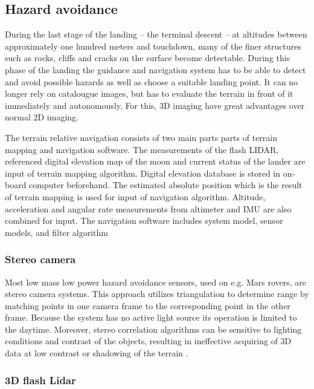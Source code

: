 \subsection{Hazard avoidance}

During the last stage of the landing – the terminal descent – at altitudes between approximately one hundred meters and touchdown, many of the finer structures such as rocks, cliffs and cracks on the surface become detectable. During this phase of the landing the guidance and navigation system has to be able to detect and avoid possible hazards as well as choose a suitable landing point. It can no longer rely on catalougue images, but has to evaluate the terrain in front of it immediately and autonomously. For this, 3D imaging have great advantages over normal 2D imaging. 

The terrain relative navigation consists of two main parts parts of terrain mapping and navigation software. The measurements of the flash LIDAR, referenced digital elevation map of the moon and current status of the lander are input of terrain mapping algorithm. Digital elevation database is stored in on-board computer beforehand. The estimated absolute position which is the result of terrain mapping is used for input of navigation algorithm. Altitude, acceleration and angular rate measurements from altimeter and IMU are also combined for input. The navigation software includes system model, sensor models, and filter algorithm



\subsubsection{Stereo camera}
Most low mass low power hazard avoidance sensors, used on e.g. Mars rovers, are stereo camera systems. This approach utilizes triangulation to determine range by matching points in one camera frame to the corresponding point in the other frame. Because the system has no active light source its operation is limited to the daytime. Moreover, stereo correlation algorithms can be sensitive to lighting conditions and contrast of the objects, resulting in ineffective acquiring of 3D data at low contrast or shadowing of the terrain \cite{structuredlight}.
 

\subsubsection{3D flash Lidar}

